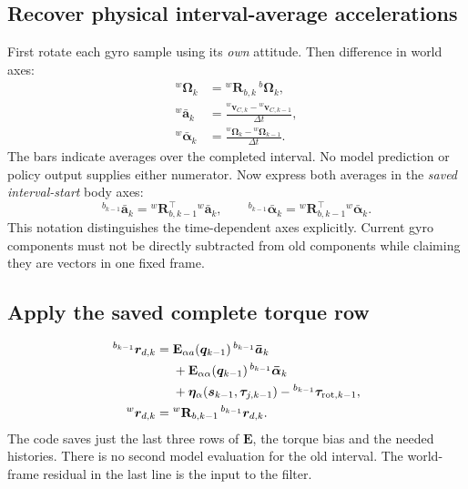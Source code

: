 \documentclass[11pt,a4paper]{article}
\newcommand{\vct}[1]{\boldsymbol{#1}}
\newcommand{\mat}[1]{\mathbf{#1}}
\newcommand{\wv}[1]{{}^{w}\vct{#1}}
\newcommand{\Rk}[1]{{}^{w}\mat R_{b,#1}}
\begin{document}
\subsection{Recover physical interval-average accelerations}
First rotate each gyro sample using its \emph{own} attitude. Then difference in
world axes:
\begin{equation}
\begin{aligned}
\wv\Omega_k&=\Rk{k}\,{}^b\vct\Omega_k,\\
\wv{\bar a}_k&=\frac{\wv v_{C,k}-\wv v_{C,k-1}}{\Delta t},\\
\wv{\bar\alpha}_k&=\frac{\wv\Omega_k-\wv\Omega_{k-1}}{\Delta t}.
\end{aligned}\label{eq:increments}
\end{equation}
The bars indicate averages over the completed interval. No model prediction or
policy output supplies either numerator. Now express both averages in the
\emph{saved interval-start} body axes:
\begin{equation}
{}^{b_{k-1}}\vct{\bar a}_k=\Rk{k-1}^\top\wv{\bar a}_k,
\qquad
{}^{b_{k-1}}\vct{\bar\alpha}_k=\Rk{k-1}^\top\wv{\bar\alpha}_k.
\label{eq:bodyincrements}
\end{equation}
This notation distinguishes the time-dependent axes explicitly. Current gyro
components must not be directly subtracted from old components while claiming
they are vectors in one fixed frame.

\subsection{Apply the saved complete torque row}
\begin{equation}
\begin{aligned}
{}^{b_{k-1}}\vct r_{d,k}={}&
\mat E_{\alpha a}(\vct q_{k-1})\,{}^{b_{k-1}}\vct{\bar a}_k\\
&+\mat E_{\alpha\alpha}(\vct q_{k-1})\,{}^{b_{k-1}}\vct{\bar\alpha}_k\\
&+\vct\eta_\alpha(\vct s_{k-1},\vct\tau_{j,k-1})
-{}^{b_{k-1}}\vct\tau_{{\rm rot},k-1},\\
\wv r_{d,k}={}&\Rk{k-1}\,{}^{b_{k-1}}\vct r_{d,k}.
\end{aligned}\label{eq:discreteraw}
\end{equation}
The code saves just the last three rows of $\mat E$, the torque bias and the
needed histories. There is no second model evaluation for the old interval.
The world-frame residual in the last line is the input to the filter.
\end{document}
